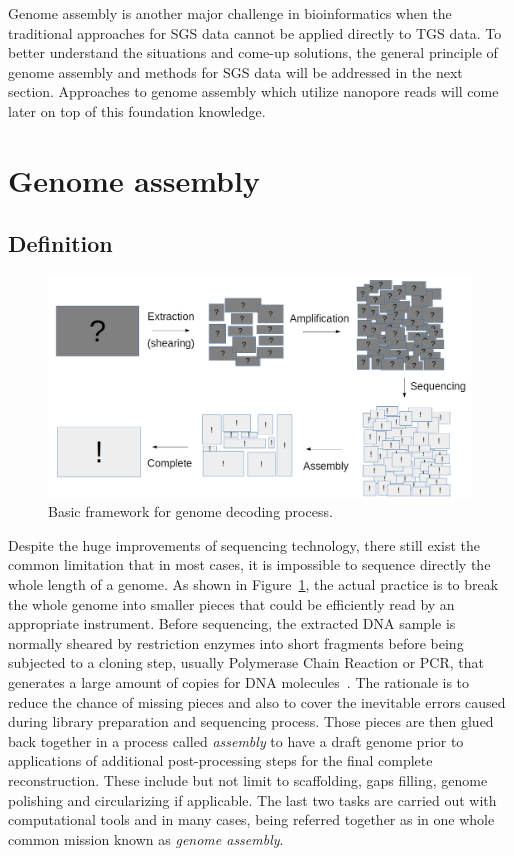 Genome assembly is another major challenge in bioinformatics when the traditional approaches for SGS data cannot be applied directly to TGS data.
To better understand the situations and come-up solutions, the general principle of genome assembly and methods for SGS data will be addressed in the next section.
Approaches to genome assembly which utilize nanopore reads will come later on top of this foundation knowledge. 

\section{Genome assembly}\label{sec:gass}
\subsection{Definition}
\begin{figure}[ht!]
\centering
\includegraphics[width=.9\textwidth]{images/genome_decoding.png}
\caption{Basic framework for genome decoding process.} 
\label{Fig:decoding}
\end{figure}

Despite the huge improvements of sequencing technology, there still exist the common limitation that in most cases, it is impossible to sequence directly the whole length of a genome. As shown in Figure~\ref{Fig:decoding}, the actual practice is to break the whole genome into smaller pieces that could be efficiently read by an appropriate instrument. 
Before sequencing, the extracted DNA sample is normally sheared by restriction enzymes into short fragments before being subjected to a cloning step, usually Polymerase Chain Reaction or PCR, that generates a large amount of copies for DNA molecules~\cite{Garibyan2013research}. The rationale is to reduce the chance of missing pieces and also to cover the inevitable errors caused during library preparation and sequencing process. 
Those pieces are then glued back together in a process called \emph{assembly} to have a draft genome prior to applications of additional post-processing steps for the final complete reconstruction.  
These include but not limit to scaffolding, gaps filling, genome polishing and circularizing if applicable.
The last two tasks are carried out with computational tools and in many cases, being referred together as in one whole common mission known as \emph{genome assembly}. 

